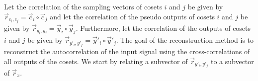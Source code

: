 \documentclass[a4paper, openany, oneside]{memoir}
\begin{document}
Let the correlation of the sampling vectors of cosets $i$ and $j$ be given by $\vec{r}_{c_i,c_j} = \vec{c}_i \circ \vec{c}_j$ and let the correlation of the pseudo outputs of cosets $i$ and $j$ be given by $\vec{r}_{y_i,y_j} = \vec{y}_i \circ \vec{y}_j$. Furthermore, let the correlation of the outputs of cosets $i$ and $j$ be given by $\vec{r}_{y'_i,y'_j} = \vec{y}'_i \circ \vec{y}'_j$. The goal of the reconstruction method is to reconstruct the autocorrelation of the input signal using the cross-correlations of all outputs of the cosets. We start by relating a subvector of $\vec{r}_{y'_i,y'_j}$ to a subvector of $\vec{r}_x$.

\begin{blockTheorem} \label{th:convolution-correlation}
     \nolinebreak
\end{blockTheorem}
\end{document}
